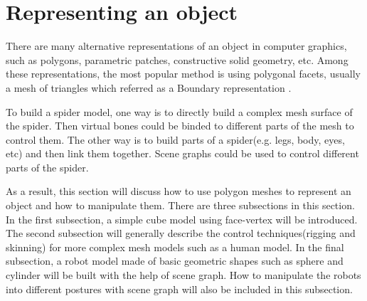 \section{Representing an object} %
\label{sec:representing_an_object}

There are many alternative representations of an object in computer graphics, such as polygons, parametric patches, constructive solid geometry, etc. Among these representations, the most popular method is using polygonal facets, usually a mesh of triangles which referred as a Boundary representation \cite{alan3D}.

To build a spider model, one way is to directly build a complex mesh surface of the spider. Then virtual bones could be binded to different parts of the mesh to control them. The other way is to build parts of a spider(e.g. legs, body, eyes, etc) and then link them together. Scene graphs could be used to control different parts of the spider.

As a result, this section will discuss how to use polygon meshes to represent an object and how to manipulate them. There are three subsections in this section. In the first subsection, a simple cube model using face-vertex will be introduced. The second subsection will generally describe the control techniques(rigging and skinning) for more complex mesh models such as a human model. In the final subsection, a robot model made of basic geometric shapes such as sphere and cylinder will be built with the help of scene graph. How to manipulate the robots into different postures with scene graph will also be included in this subsection. 



